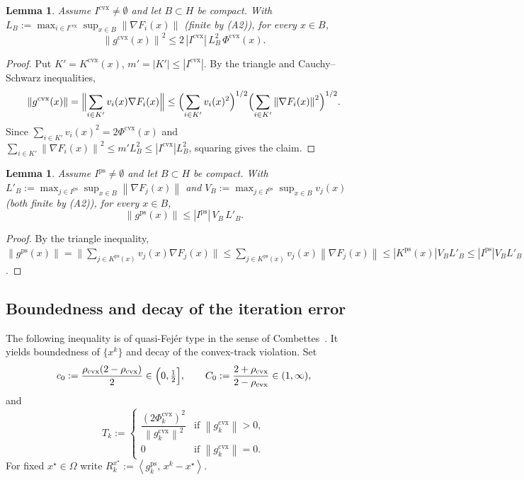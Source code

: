 \documentclass[]{interact}
\theoremstyle{plain}
\newtheorem{lemma}[theorem]{Lemma}
\theoremstyle{definition}
\theoremstyle{remark}
\newcommand{\norm}[1]{\left\lVert #1 \right\rVert}
\newcommand{\abs}[1]{\left\lvert #1 \right\rvert}
\newcommand{\inner}[2]{\left\langle #1,\, #2 \right\rangle}
\newcommand{\cvx}{\mathrm{cvx}}
\newcommand{\ps}{\mathrm{ps}}
\begin{document}
\begin{lemma}\label{lem:bound-cvx}
Assume $I^{\cvx}\ne\emptyset$ and let $B\subset H$ be compact. With $L_B:=\max_{i\in I^{\cvx}}\sup_{x\in B}\norm{\nabla F_i(x)}$ (finite by (A2)), for every $x\in B$,
\[
\norm{g^{\cvx}(x)}^2\le 2\,\abs{I^{\cvx}}\,L_B^2\,\Phi^{\cvx}(x).
\]
\end{lemma}
\begin{proof}
Put $K'=K^{\cvx}(x)$, $m'=\abs{K'}\le\abs{I^{\cvx}}$. By the triangle and Cauchy--Schwarz inequalities,
\[
\norm{g^{\cvx}(x)}=\Bigl\|\sum_{i\in K'}v_i(x)\nabla F_i(x)\Bigr\|
\le\Bigl(\sum_{i\in K'}v_i(x)^2\Bigr)^{1/2}\Bigl(\sum_{i\in K'}\norm{\nabla F_i(x)}^2\Bigr)^{1/2}.
\]
Since $\sum_{i\in K'}v_i(x)^2=2\Phi^{\cvx}(x)$ and $\sum_{i\in K'}\norm{\nabla F_i(x)}^2\le m'L_B^2\le\abs{I^{\cvx}}L_B^2$, squaring gives the claim.
\end{proof}

\begin{lemma}\label{lem:bound-ps}
Assume $I^{\ps}\ne\emptyset$ and let $B\subset H$ be compact. With $L'_B:=\max_{j\in I^{\ps}}\sup_{x\in B}\norm{\nabla F_j(x)}$ and $V_B:=\max_{j\in I^{\ps}}\sup_{x\in B}v_j(x)$ (both finite by (A2)), for every $x\in B$,
\[
\norm{g^{\ps}(x)}\le\abs{I^{\ps}}\,V_B\,L'_B .
\]
\end{lemma}
\begin{proof}
By the triangle inequality, $\norm{g^{\ps}(x)}=\bigl\|\sum_{j\in K^{\ps}(x)}v_j(x)\nabla F_j(x)\bigr\| \le\sum_{j\in K^{\ps}(x)}v_j(x)\norm{\nabla F_j(x)}\le\abs{K^{\ps}(x)}V_BL'_B \le\abs{I^{\ps}}V_BL'_B$.
\end{proof}

\subsection{Boundedness and decay of the iteration error}\label{ssec:bounded}
The following inequality is of quasi-Fej\'er type in the sense of Combettes~\citep{combettes2001quasifejer}. It yields boundedness of $\{x^k\}$ and decay of the convex-track violation. Set
\begin{equation}\label{eq:c0C0}
c_0:=\frac{\rho_{\cvx}(2-\rho_{\cvx})}{2}\in\Bigl(0,\tfrac12\Bigr],\qquad
C_0:=\frac{2+\rho_{\cvx}}{2-\rho_{\cvx}}\in(1,\infty),
\end{equation}
and
\begin{equation}\label{eq:Tk}
T_k:=\begin{cases}\dfrac{(2\Phi^{\cvx}_k)^2}{\norm{g^{\cvx}_k}^2} & \text{if }\norm{g^{\cvx}_k}>0,\\ 0 & \text{if }\norm{g^{\cvx}_k}=0.\end{cases}
\end{equation}
For fixed $x^\star\in\Omega$ write $R^{x^\star}_k:=\inner{g^{\ps}_k}{x^k-x^\star}$.
\end{document}
